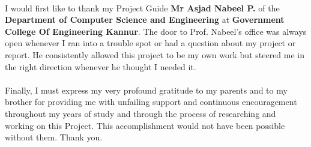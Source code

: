 \thispagestyle{plain}
\paragraph{}I would first like to thank my Project Guide \textbf{Mr Asjad Nabeel P.} of the \textbf{Department of Computer Science and Engineering} at \textbf{Government College Of Engineering Kannur}. The door to Prof. Nabeel's office was always open whenever I ran into a trouble spot or had a question about my project or report. He consistently allowed this project to be my own work but steered me in the right direction whenever he thought I needed it.
\paragraph{} Finally, I must express my very profound gratitude to my parents and to my brother for providing me with unfailing support and continuous encouragement throughout my years of study and through the process of researching and working on this Project. This accomplishment would not have been possible without them. Thank you.
